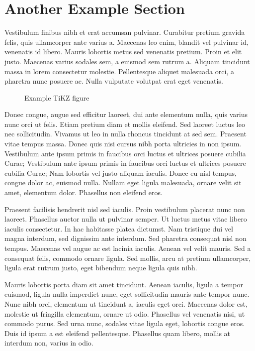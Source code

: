 \section{Another Example Section}
\label{sec:tikz}

Vestibulum finibus nibh et erat accumsan pulvinar.
Curabitur pretium gravida felis, quis ullamcorper ante varius a.
Maecenas leo enim, blandit vel pulvinar id, venenatis id libero.
Mauris lobortis metus sed venenatis pretium.
Proin et elit justo.
Maecenas varius sodales sem, a euismod sem rutrum a.
Aliquam tincidunt massa in lorem consectetur molestie.
Pellentesque aliquet malesuada orci, a pharetra nunc posuere ac.
Nulla vulputate volutpat erat eget venenatis.

\begin{figure}[htbp]
  \centering
  
  \caption{Example TiKZ figure}
  \label{fig:tikz}
\end{figure}

Donec congue, augue sed efficitur laoreet, dui ante elementum nulla, quis varius nunc orci ut felis.
Etiam pretium diam et mollis eleifend.
Sed laoreet luctus leo nec sollicitudin.
Vivamus ut leo in nulla rhoncus tincidunt at sed sem.
Praesent vitae tempus massa.
Donec quis nisi cursus nibh porta ultricies in non ipsum.
Vestibulum ante ipsum primis in faucibus orci luctus et ultrices posuere cubilia Curae; Vestibulum ante ipsum primis in faucibus orci luctus et ultrices posuere cubilia Curae; Nam lobortis vel justo aliquam iaculis.
Donec eu nisl tempus, congue dolor ac, euismod nulla.
Nullam eget ligula malesuada, ornare velit sit amet, elementum dolor.
Phasellus non eleifend eros.




Praesent facilisis hendrerit nisl sed iaculis.
Proin vestibulum placerat nunc non laoreet.
Phasellus auctor nulla ut pulvinar semper.
Ut luctus metus vitae libero iaculis consectetur.
In hac habitasse platea dictumst.
Nam tristique dui vel magna interdum, sed dignissim ante interdum.
Sed pharetra consequat nisl non tempus.
Maecenas vel augue ac est lacinia iaculis.
Aenean vel velit mauris.
Sed a consequat felis, commodo ornare ligula.
Sed mollis, arcu at pretium ullamcorper, ligula erat rutrum justo, eget bibendum neque ligula quis nibh.


Mauris lobortis porta diam sit amet tincidunt.
Aenean iaculis, ligula a tempor euismod, ligula nulla imperdiet nunc, eget sollicitudin mauris ante tempor nunc.
Nunc nibh orci, elementum ut tincidunt a, iaculis eget orci.
Maecenas dolor est, molestie ut fringilla elementum, ornare ut odio.
Phasellus vel venenatis nisi, ut commodo purus.
Sed urna nunc, sodales vitae ligula eget, lobortis congue eros.
Duis id ipsum a est eleifend pellentesque.
Phasellus quam libero, mollis at interdum non, varius in odio.
